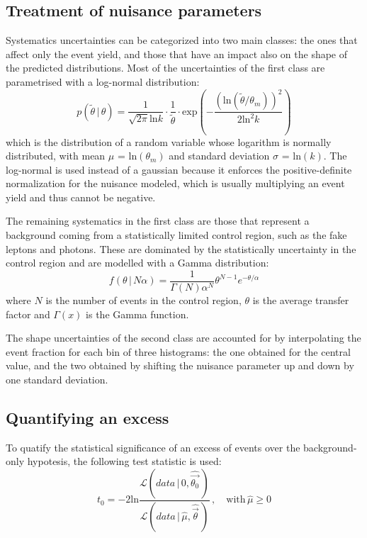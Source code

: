 \subsection{Treatment of nuisance parameters}
Systematics uncertainties can be categorized into two main classes: the ones that affect only the event yield, and those that have an impact also on the shape of the predicted distributions.
Most of the uncertainties of the first class are parametrised with a log-normal distribution:
\begin{equation}
  \label{eq:lnNdef}
  p(\tilde{\theta}\,|\,\theta) = \frac{1}{\sqrt{2 \pi} \text{ln} k} \cdot \frac{1}{\tilde{\theta}} \cdot \text{exp} \left( -\frac{(\text{ln}(\tilde{\theta}/\theta_m))^2}{2 \text{ln}^2 k} \right)
\end{equation}
which is the distribution of a random variable whose logarithm is normally distributed, with mean $\mu$ = $\text{ln}(\theta_m)$ and standard deviation $\sigma$ = $\text{ln}(k)$.
The log-normal is used instead of a gaussian because it enforces the positive-definite normalization for the nuisance modeled, which is usually multiplying an event yield and thus cannot be negative.

The remaining systematics in the first class are those that represent a background coming from a statistically limited control region, such as the fake leptons and photons.
These are dominated by the statistically uncertainty in the control region and are modelled with a Gamma distribution:
\begin{equation}
  \label{eq:gammadef}
  f(\theta\,|\,N\alpha) = \frac{1}{\Gamma(N) \alpha^N} \theta^{N-1} e^{-\theta/\alpha}
\end{equation}
where $N$ is the number of events in the control region, $\theta$ is the average transfer factor and $\Gamma(x)$ is the Gamma function.

The shape uncertainties of the second class are accounted for by interpolating the event fraction for each bin of three histograms: the one obtained for the central value, and the two obtained by shifting the nuisance parameter up and down by one standard deviation.

\subsection{Quantifying an excess}
To quatify the statistical significance of an excess of events over the background-only hypotesis, the following test statistic is used:
\begin{equation}
  \label{eq:test_statistic}
  t_0 = -2\text{ln} \frac {\mathcal{L}(data\,|\,0,\widehat{\vec{\theta_0}}\,)} {\mathcal{L}(data\,|\,\hat\mu,\widehat{\vec\theta}\,)}\,,\quad \text{with}\, \hat\mu \ge 0
\end{equation}

